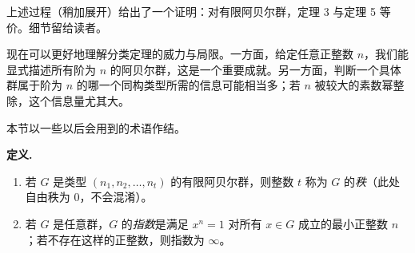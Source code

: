 上述过程（稍加展开）给出了一个证明：对有限阿贝尔群，定理 3 与定理 5 等价。细节留给读者。

现在可以更好地理解分类定理的威力与局限。一方面，给定任意正整数 $n$，我们能显式描述所有阶为 $n$ 的阿贝尔群，这是一个重要成就。另一方面，判断一个具体群属于阶为 $n$ 的哪一个同构类型所需的信息可能相当多；若 $n$ 被较大的素数幂整除，这个信息量尤其大。

本节以一些以后会用到的术语作结。

\noindent\textbf{定义.}
\begin{enumerate}[label=(\arabic*)]
  \item 若 $G$ 是类型 $(n_1,n_2,
\ldots,n_t)$ 的有限阿贝尔群，则整数 $t$ 称为 $G$ 的\emph{秩}（此处自由秩为 $0$，不会混淆）。
  \item 若 $G$ 是任意群，$G$ 的\emph{指数}是满足 $x^n=1$ 对所有 $x\in G$ 成立的最小正整数 $n$；若不存在这样的正整数，则指数为 $\infty$。
\end{enumerate}

